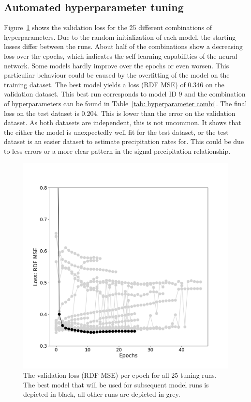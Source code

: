 \documentclass[twocolumn, 10pt, a4paper]{memoir}
\begin{document}
	\subsection*{Automated hyperparameter tuning}
	Figure~\ref{fig: loss epochs} shows the validation loss for the 25 different combinations of hyperparameters. Due to the random initialization of each model, the starting losses differ between the runs. About half of the combinations show a decreasing loss over the epochs, which indicates the self-learning capabilities of the neural network. Some models hardly improve over the epochs or even worsen. This particuliar behaviour could be caused by the overfitting of the model on the training dataset. The best model yields a loss (RDF MSE) of 0.346 on the validation dataset. This best run corresponds to model ID 9 and the combination of hyperparameters can be found in Table~\ref{tab: hyperparameter combi}. The final loss on the test dataset is 0.204. This is lower than the error on the validation dataset. As both datasets are independent, this is not uncommon. It shows that the either the model is unexpectedly well fit for the test dataset, or the test dataset is an easier dataset to estimate precipitation rates for. This could be due to less errors or a more clear pattern in the signal-precipitation relationship.
	
	\begin{figure}[h]
		\includegraphics[width=\columnwidth]{ex_loss_epochs}
		\caption{The validation loss (RDF MSE) per epoch for all 25 tuning runs. The best model that will be used for subsequent model runs is depicted in black, all other runs are depicted in grey.}
		\label{fig: loss epochs}
	\end{figure}
\end{document}
